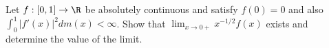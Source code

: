 Let $f:[0,1]\rightarrow\R$ be absolutely continuous and satisfy
$f(0)=0$ and also $\int_0^1|f'(x)|^2 dm(x)<\infty$. Show that
$\lim_{x\rightarrow 0+}x^{-1/2}f(x)$ exists and determine the value of
the limit.
